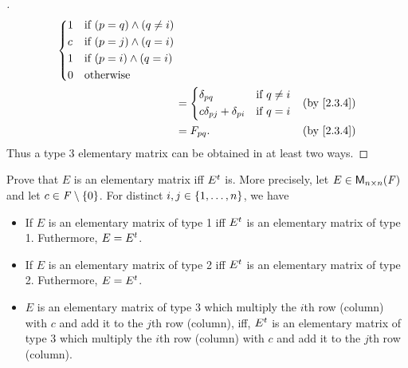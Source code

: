 \begin{proof}[]
\begin{align*}
\begin{dcases}
                                                      1 & \text{if } (p = q) \land (q \neq i) \\
                                                      c & \text{if } (p = j) \land (q = i)    \\
                                                      1 & \text{if } (p = i) \land (q = i)    \\
                                                      0 & \text{otherwise}
                                                    \end{dcases}                              \\
                                                & = \begin{dcases}
                                                      \delta_{p q}                  & \text{if } q \neq i \\
                                                      c \delta_{p j} + \delta_{p i} & \text{if } q = i
                                                    \end{dcases} &  & \by{2.3.4}                  \\
                                                & = F_{p q}.                                             &  & \by{2.3.4}
  \end{align*}
  Thus a type 3 elementary matrix can be obtained in at least two ways.
\end{proof}

\begin{ex}\label{ex:3.1.5}
  Prove that \(E\) is an elementary matrix iff \({E}^{t}\) is.
  More precisely, let \(E \in \ms[n][n][\F]\) and let \(c \in \mathit{F} \setminus \left\lbrace0\right\rbrace\).
  For distinct \(i, j \in \left\lbrace1, \dots, n\right\rbrace\), we have
  \begin{itemize}
    \item If \(E\) is an elementary matrix of type 1 iff \({E}^{t}\) is an elementary matrix of type 1.
          Futhermore, \(E = {E}^{t}\).
    \item If \(E\) is an elementary matrix of type 2 iff \({E}^{t}\) is an elementary matrix of type 2.
          Futhermore, \(E = {E}^{t}\).
    \item \(E\) is an elementary matrix of type 3 which multiply the \(i\)th row (column) with \(c\) and add it to the \(j\)th row (column), iff, \({E}^{t}\) is an elementary matrix of type 3 which multiply the \(i\)th row (column) with \(c\) and add it to the \(j\)th row (column).
  \end{itemize}
\end{ex}

